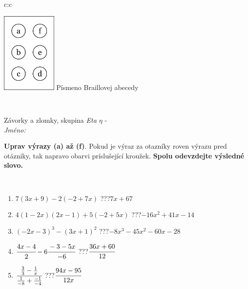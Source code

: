 \documentclass[10pt]{report}
\begin{document}
\begin{tabular}{c:c}
\begin{minipage}[c][104.5mm][t]{0.5\linewidth}
\begin{center}
\begin{minipage}{0.20\linewidth}
\begin{center}
\includegraphics[height=40mm]{../images/braille.png}
{\small Písmeno Braillovej abecedy}
\end{center}
\end{minipage}
\end{center}
\end{minipage}
\\ \hdashline
\begin{minipage}[c][104.5mm][t]{0.5\linewidth}
\begin{center}
\vspace{7mm}
{\huge Závorky a zlomky, skupina \textit{Eta $\eta$} -}\\[5mm]
\textit{Jméno:}\phantom{xxxxxxxxxxxxxxxxxxxxxxxxxxxxxxxxxxxxxxxxxxxxxxxxxxxxxxxxxxxxxxxxx}\\[5mm]
\begin{minipage}{0.95\linewidth}
\begin{center}
\textbf{Uprav výrazy (a) až (f)}. Pokud je výraz za otazníky roven výrazu pred otázniky, tak napravo obarvi príslušející kroužek. \textbf{Spolu odevzdejte výsledné slovo.}
\end{center}
\end{minipage}
\\[1mm]
\begin{minipage}{0.79\linewidth}
\begin{center}
\begin{varwidth}{\linewidth}
\begin{enumerate}
\normalsize
\item $7(3x+9)-2(-2+7x)$\quad \dotfill\; ???\;\dotfill \quad $7x+67$
\item $4(1-2x)(2x-1)+5(-2+5x)$\quad \dotfill\; ???\;\dotfill \quad $-16x^2+41x-14$
\item $(-2x-3)^3-(3x+1)^2$\quad \dotfill\; ???\;\dotfill \quad $-8x^3-45x^2-60x-28$
\item $\cfrac{4x-4}{2}-6\cfrac{-3-5x}{-6}$\quad \dotfill\; ???\;\dotfill \quad $\cfrac{36x+60}{12}$
\item $\cfrac{\frac{3}{3}-\frac{1}{x}}{\frac{1}{-8}+\frac{-1}{-4}}$\quad \dotfill\; ???\;\dotfill \quad $\cfrac{94x-95}{12x}$

\end{enumerate}
\end{varwidth}
\end{center}
\end{minipage}
\end{center}
\end{minipage}
\end{tabular}
\end{document}
